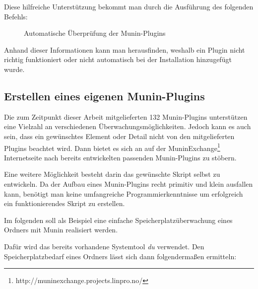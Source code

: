 Diese hilfreiche Unterstützung bekommt man durch die Ausführung des folgenden Befehls:

\begin{figure}[ht]
	\centering
		\caption{Automatische Überprüfung der Munin-Plugins}
		\label{suggest}
\end{figure}

Anhand dieser Informationen kann man herausfinden, weshalb ein Plugin nicht richtig funktioniert oder nicht automatisch bei der Installation hinzugefügt wurde.
\newpage
\subsection{Erstellen eines eigenen Munin-Plugins}

Die zum Zeitpunkt dieser Arbeit mitgelieferten 132 Munin-Plugins unterstützen eine Vielzahl an verschiedenen Überwachungsmöglichkeiten.
Jedoch kann es auch sein, dass ein gewünschtes Element oder Detail nicht von den mitgelieferten Plugins beachtet wird.
Dann bietet es sich an auf der MuninExchange\footnote{http://muninexchange.projects.linpro.no/} Internetseite nach bereits entwickelten passenden Munin-Plugins zu stöbern.

Eine weitere Möglichkeit besteht darin das gewünschte Skript selbst zu entwickeln.
Da der Aufbau eines Munin-Plugins recht primitiv und klein ausfallen kann, benötigt man keine umfangreiche Programmierkenntnisse um erfolgreich ein funktionierendes Skript zu erstellen.

Im folgenden soll als Beispiel eine einfache Speicherplatzüberwachung eines Ordners mit Munin realisiert werden.

Dafür wird das bereits vorhandene Systemtool \textit{du} verwendet.
Den Speicherplatzbedarf eines Ordners lässt sich dann folgendermaßen ermitteln:

